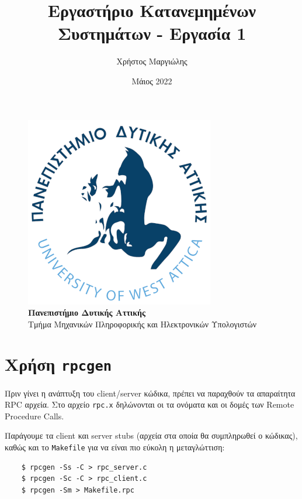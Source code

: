 \documentclass{article}
\title{Εργαστήριο Κατανεμημένων Συστημάτων - Εργασία 1}
\author{Χρήστος Μαργιώλης}
\date{Μάιος 2022}
\begin{document}
\begin{titlepage}
        \maketitle
        \begin{figure}[t!]
        \begin{center}
        \includegraphics[scale=0.3]{./res/uniwalogo.png} \\
        \Large
        \textbf{Πανεπιστήμιο Δυτικής Αττικής} \\
        \large
        Τμήμα Μηχανικών Πληροφορικής και Ηλεκτρονικών Υπολογιστών
        \end{center}
        \end{figure}
\end{titlepage}

\renewcommand{\contentsname}{Περιεχόμενα}
\tableofcontents

\section{Χρήση \lstinline{rpcgen}}

Πριν γίνει η ανάπτυξη του client/server κώδικα, πρέπει να παραχθούν τα
απαραίτητα RPC αρχεία. Στο αρχείο \lstinline{rpc.x} δηλώνονται οι τα ονόματα
και οι δομές των Remote Procedure Calls.

Παράγουμε τα client και server stubs (αρχεία στα οποία θα συμπληρωθεί ο
κώδικας), καθώς και το \lstinline{Makefile} για να είναι πιο εύκολη η
μεταγλώττιση:

\begin{lstlisting}
	$ rpcgen -Ss -C > rpc_server.c
	$ rpcgen -Sc -C > rpc_client.c
	$ rpcgen -Sm > Makefile.rpc
\end{lstlisting}
\end{document}
